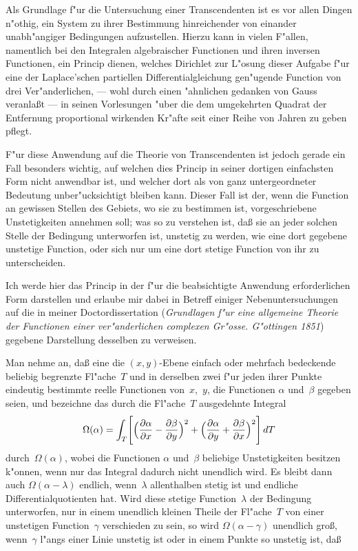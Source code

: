 \documentclass[12pt,a4paper]{book}
\theoremstyle{definition}
\theoremstyle{remark}
\begin{document}
Als Grundlage f"ur die Untersuchung einer Transcendenten ist es vor
allen Dingen n"othig, ein System zu ihrer Bestimmung hinreichender von
einander unabh"angiger Bedingungen aufzustellen. Hierzu kann in vielen
F"allen, namentlich bei den Integralen algebraischer Functionen und ihren
inversen Functionen, ein Princip dienen, welches Dirichlet zur L"osung
dieser Aufgabe f"ur eine der Laplace'schen partiellen Differentialgleichung
gen"ugende Function von drei Ver"anderlichen, --- wohl durch einen "ahnlichen
gedanken von Gauss veranla\ss{}t --- in seinen Vorlesungen "uber die dem
umgekehrten Quadrat der Entfernung proportional wirkenden Kr"afte seit
einer Reihe von Jahren zu geben pflegt.

F"ur diese Anwendung auf die Theorie von Transcendenten ist jedoch
gerade ein Fall besonders wichtig, auf welchen dies Princip in seiner
dortigen einfachsten Form nicht anwendbar ist, und welcher dort als von
ganz untergeordneter Bedeutung unber"ucksichtigt bleiben kann. Dieser
Fall ist der, wenn die Function an gewissen Stellen des Gebiets, wo sie
zu bestimmen ist, vorgeschriebene Unstetigkeiten annehmen soll; was so
zu verstehen ist, da\ss{} sie an jeder solchen Stelle der Bedingung unterworfen
ist, unstetig zu werden, wie eine dort gegebene unstetige Function, oder
sich nur um eine dort stetige Function von ihr zu unterscheiden.

Ich werde hier das Princip in der f"ur die beabsichtigte Anwendung
erforderlichen Form darstellen und erlaube mir dabei in Betreff einiger
Nebenuntersuchungen auf die in meiner Doctordissertation (\textit{Grundlagen
f"ur eine allgemeine Theorie der Functionen einer ver"anderlichen complexen
Gr"osse. G"ottingen 1851}) gegebene Darstellung desselben zu verweisen.

Man nehme an, da\ss{} eine die $(x,y)$-Ebene einfach oder mehrfach
bedeckende beliebig begrenzte Fl"ache~$T$ und in derselben zwei f"ur jeden
ihrer Punkte eindeutig bestimmte reelle Functionen von~$x$,~$y$, die
Functionen $\alpha$ und~$\beta$ gegeben seien, und bezeichne das durch die Fl"ache~$T$
ausgedehnte Integral
\begin{equation}
\label{eq:omega}
\Omega(\alpha) = \int_T\Biggl[\Bigl(\frac{\partial\alpha}{\partial x}
- \frac{\partial\beta}{\partial y}\Bigr)^2 + \Bigl(\frac{\partial\alpha}{\partial y}
+ \frac{\partial\beta}{\partial x}\Bigr)^2\Biggr]\,dT
\end{equation}
durch~$\Omega(\alpha)$, wobei die Functionen $\alpha$ und~$\beta$ beliebige
Unstetigkeiten besitzen k"onnen, wenn nur das Integral dadurch nicht
unendlich wird. Es bleibt dann auch $\Omega(\alpha - \lambda)$ endlich, wenn~$\lambda$
allenthalben stetig ist und endliche Differentialquotienten hat. Wird diese
stetige Function~$\lambda$ der Bedingung unterworfen, nur in einem unendlich
kleinen Theile der Fl"ache~$T$ von einer unstetigen Function~$\gamma$
verschieden zu sein, so wird $\Omega(\alpha - \gamma)$ unendlich gro\ss{}, wenn~$\gamma$
l"angs einer Linie unstetig ist oder in einem Punkte so unstetig ist, da\ss{}
\end{document}
